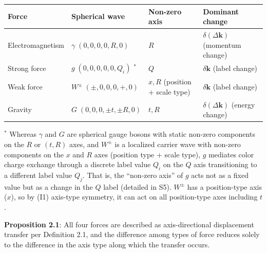 \documentclass[
  a4paper,11pt]{article}
\newcounter{none}
\theoremstyle{definition}
\theoremstyle{remark}
\begin{document}
{\def\LTcaptype{none} %
\begin{longtable}[]{@{}
  >{\raggedright\arraybackslash}p{}
  >{\raggedright\arraybackslash}p{}
  >{\raggedright\arraybackslash}p{}
  >{\raggedright\arraybackslash}p{}@{}}
\toprule\noalign{}
\begin{minipage}[b]{\linewidth}\raggedright
Force
\end{minipage} & \begin{minipage}[b]{\linewidth}\raggedright
Spherical wave
\end{minipage} & \begin{minipage}[b]{\linewidth}\raggedright
Non-zero axis
\end{minipage} & \begin{minipage}[b]{\linewidth}\raggedright
Dominant change
\end{minipage} \\
\midrule\noalign{}
\endhead
\bottomrule\noalign{}
\endlastfoot
Electromagnetism & \(\gamma\; (0,0,0,0,R,0)\) & \(R\) &
\(\delta(\Delta\mathbf{k})\) (momentum change) \\
Strong force & \(g\; (0,0,0,0,0,Q_i)\) \({}^{*}\) & \(Q\) &
\(\delta\mathbf{k}\) (label change) \\
Weak force & \(W^{\pm}\; (\pm,0,0,0,+,0)\) & \(x, R\) (position + scale
type) & \(\delta\mathbf{k}\) (label change) \\
Gravity & \(G\; (0,0,0,\pm t,\pm R,0)\) & \(t, R\) &
\(\delta(\Delta\mathbf{k})\) (energy change) \\
\end{longtable}
}

\({}^{*}\) Whereas \(\gamma\) and \(G\) are spherical gauge bosons with
static non-zero components on the \(R\) or \((t, R)\) axes, and
\(W^{\pm}\) is a localized carrier wave with non-zero components on the
\(x\) and \(R\) axes (position type + scale type), \(g\) mediates color
charge exchange through a discrete label value \(Q_i\) on the \(Q\) axis
transitioning to a different label value \(Q_j\). That is, the
``non-zero axis'' of \(g\) acts not as a fixed value but as a change in
the \(Q\) label (detailed in S5). \(W^{\pm}\) has a position-type axis
(\(x\)), so by (I1) axis-type symmetry, it can act on all position-type
axes including \(t\).

\textbf{Proposition 2.1}: All four forces are described as
axis-directional displacement transfer per Definition 2.1, and the
difference among types of force reduces solely to the difference in the
axis type along which the transfer occurs.
\end{document}
